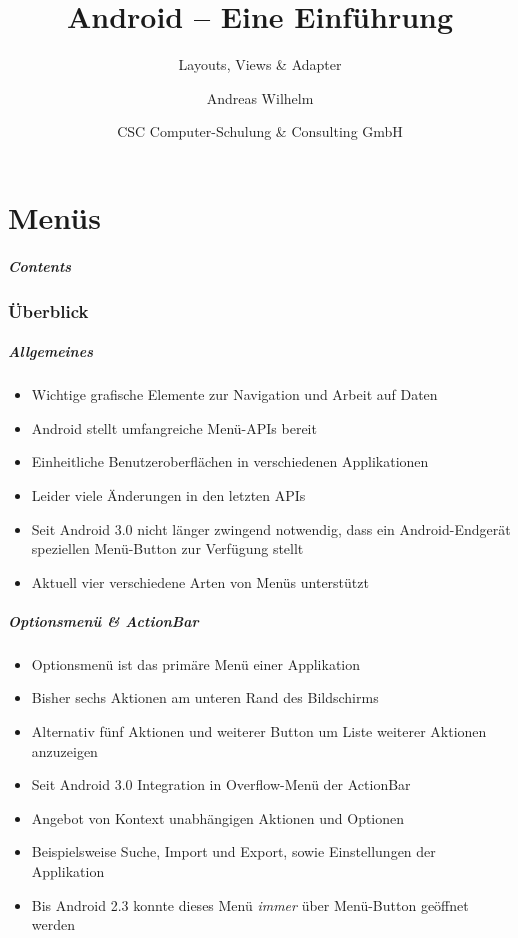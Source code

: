 \title{Android -- Eine Einführung}
\subtitle{Layouts, Views \& Adapter}
\author[A. Wilhelm]{Andreas Wilhelm}
\titlegraphic{}
\date{CSC Computer-Schulung \& Consulting GmbH}

\begin{frame}[plain]
  \titlepage
\end{frame}

\part{Menüs}
\frame{\partpage}
\begin{frame}
	\frametitle{Contents}
	\tableofcontents[]
\end{frame}

\section{Überblick}
\begin{frame}
   \frametitle{Allgemeines}
   \begin{itemize}
      \item Wichtige grafische Elemente zur Navigation und Arbeit auf Daten
      \item Android stellt umfangreiche Menü-APIs bereit
      \item Einheitliche Benutzeroberflächen in verschiedenen Applikationen
      \item Leider viele Änderungen in den letzten APIs
      \item Seit Android 3.0 nicht länger zwingend notwendig, dass ein Android-Endgerät 
         speziellen Menü-Button zur Verfügung stellt
      \item Aktuell vier verschiedene Arten von Menüs unterstützt
   \end{itemize}
\end{frame}

\begin{frame}
   \frametitle{Optionsmenü \& ActionBar}
   \begin{itemize}
      \item Optionsmenü ist das primäre Menü einer Applikation
      \item Bisher sechs Aktionen am unteren Rand des Bildschirms
      \item Alternativ fünf Aktionen und weiterer Button um Liste weiterer Aktionen anzuzeigen
      \item Seit Android 3.0 Integration in Overflow-Menü der ActionBar
      \item Angebot von Kontext unabhängigen Aktionen und Optionen
      \item Beispielsweise Suche, Import und Export, sowie Einstellungen der Applikation
      \item Bis Android 2.3 konnte dieses Menü \emph{immer} über Menü-Button geöffnet werden
   \end{itemize}
\end{frame}

